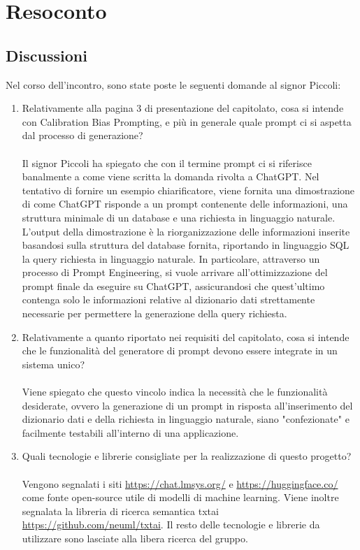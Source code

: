 \documentclass[12pt]{article}
\begin{document}
\section{Resoconto} \label{sec:resoconto}
\subsection{Discussioni} \label{subsec:resdiscussione}
Nel corso dell'incontro, sono state poste le seguenti domande al signor Piccoli:
\begin{enumerate}
    \item Relativamente alla pagina 3 di presentazione del capitolato, cosa si intende con Calibration Bias Prompting, e più in generale quale prompt ci si aspetta dal processo di generazione?\\ \\
Il signor Piccoli ha spiegato che con il termine prompt ci si riferisce banalmente a come viene scritta la domanda rivolta a ChatGPT. Nel tentativo di fornire un esempio chiarificatore, viene fornita una dimostrazione di come ChatGPT risponde a un prompt contenente delle informazioni, una struttura minimale di un database e una richiesta in linguaggio naturale. L'output della dimostrazione è la riorganizzazione delle informazioni inserite basandosi sulla struttura del database fornita, riportando in linguaggio SQL la query richiesta in linguaggio naturale. In particolare, attraverso un processo di Prompt Engineering, si vuole arrivare all'ottimizzazione del prompt finale da eseguire su ChatGPT, assicurandosi che quest'ultimo contenga solo le informazioni relative al dizionario dati strettamente necessarie per permettere la generazione della query richiesta.
    \item Relativamente a quanto riportato nei requisiti del capitolato, cosa si intende che le funzionalità del generatore di prompt devono essere integrate in un sistema unico? \\ \\
Viene spiegato che questo vincolo indica la necessità che le funzionalità desiderate, ovvero la generazione di un prompt in risposta all'inserimento del dizionario dati e della richiesta in linguaggio naturale, siano "confezionate" e facilmente testabili all'interno di una applicazione.
    \item Quali tecnologie e librerie consigliate per la realizzazione di questo progetto? \\ \\
Vengono segnalati i siti \url{https://chat.lmsys.org/} e \url{https://huggingface.co/} come fonte open-source utile di modelli di machine learning. Viene inoltre segnalata la libreria di ricerca semantica txtai \url{https://github.com/neuml/txtai}. Il resto delle tecnologie e librerie da utilizzare sono lasciate alla libera ricerca del gruppo.

\end{enumerate}
\end{document}
